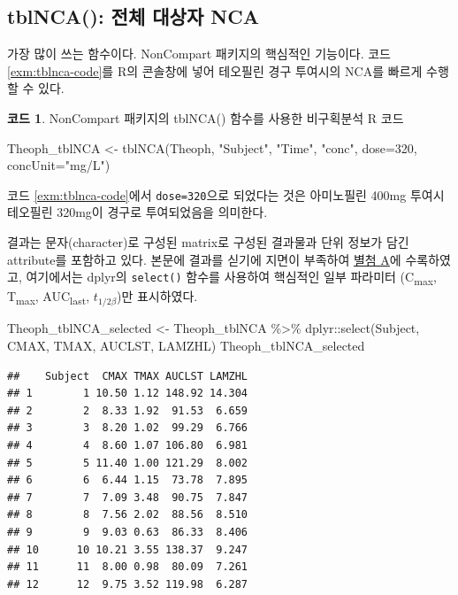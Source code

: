 \documentclass[
  11pt,
  krantz2, a4paper, twoside]{krantz}
\newenvironment{Shaded}{\begin{snugshade}}{\end{snugshade}}
\newcommand{\AttributeTok}[1]{\textcolor[rgb]{0.77,0.63,0.00}{#1}}
\newcommand{\DecValTok}[1]{\textcolor[rgb]{0.00,0.00,0.81}{#1}}
\newcommand{\FunctionTok}[1]{\textcolor[rgb]{0.00,0.00,0.00}{#1}}
\newcommand{\NormalTok}[1]{#1}
\newcommand{\OtherTok}[1]{\textcolor[rgb]{0.56,0.35,0.01}{#1}}
\newcommand{\SpecialCharTok}[1]{\textcolor[rgb]{0.00,0.00,0.00}{#1}}
\newcommand{\StringTok}[1]{\textcolor[rgb]{0.31,0.60,0.02}{#1}}
\theoremstyle{definition}
\theoremstyle{definition}
\newtheorem{example}{코드}[chapter]
\theoremstyle{definition}
\theoremstyle{definition}
\theoremstyle{remark}
\begin{document}
\hypertarget{tblNCA}{%
\subsection{tblNCA(): 전체 대상자 NCA}\label{tblNCA}}

가장 많이 쓰는 함수이다.
NonCompart 패키지의 핵심적인 기능이다.
코드 \ref{exm:tblnca-code}를 R의 콘솔창에 넣어 테오필린 경구 투여시의 NCA를 빠르게 수행할 수 있다.

\begin{example}
\protect\hypertarget{exm:tblnca-code}{}{\label{exm:tblnca-code} }NonCompart 패키지의 tblNCA() 함수를 사용한 비구획분석 R 코드
\end{example}
\vspace{-5ex}

\begin{Shaded}
\begin{Highlighting}[]
\NormalTok{Theoph\_tblNCA }\OtherTok{\textless{}{-}} \FunctionTok{tblNCA}\NormalTok{(Theoph, }\StringTok{"Subject"}\NormalTok{, }\StringTok{"Time"}\NormalTok{, }\StringTok{"conc"}\NormalTok{, }
                        \AttributeTok{dose=}\DecValTok{320}\NormalTok{, }\AttributeTok{concUnit=}\StringTok{"mg/L"}\NormalTok{)}
\end{Highlighting}
\end{Shaded}

코드 \ref{exm:tblnca-code}에서 \texttt{dose=320}으로 되었다는 것은 아미노필린 400mg 투여시 테오필린 320mg이 경구로 투여되었음을 의미한다.

결과는 문자(character)로 구성된 matrix로 구성된 결과물과 단위 정보가 담긴 attribute를 포함하고 있다.
본문에 결과를 싣기에 지면이 부족하여 \protect\hyperlink{Theoph_tblNCA}{별첨 A}에 수록하였고, 여기에서는 dplyr의 \texttt{select()} 함수를 사용하여 핵심적인 일부 파라미터 (C\textsubscript{max}, T\textsubscript{max}, AUC\textsubscript{last}, \(t_{1/2\beta}\))만 표시하였다.

\begin{Shaded}
\begin{Highlighting}[]
\NormalTok{Theoph\_tblNCA\_selected }\OtherTok{\textless{}{-}}\NormalTok{ Theoph\_tblNCA }\SpecialCharTok{\%\textgreater{}\%} 
\NormalTok{  dplyr}\SpecialCharTok{::}\FunctionTok{select}\NormalTok{(Subject, CMAX, TMAX, AUCLST, LAMZHL)}
\NormalTok{Theoph\_tblNCA\_selected}
\end{Highlighting}
\end{Shaded}

\begin{verbatim}
##    Subject  CMAX TMAX AUCLST LAMZHL
## 1        1 10.50 1.12 148.92 14.304
## 2        2  8.33 1.92  91.53  6.659
## 3        3  8.20 1.02  99.29  6.766
## 4        4  8.60 1.07 106.80  6.981
## 5        5 11.40 1.00 121.29  8.002
## 6        6  6.44 1.15  73.78  7.895
## 7        7  7.09 3.48  90.75  7.847
## 8        8  7.56 2.02  88.56  8.510
## 9        9  9.03 0.63  86.33  8.406
## 10      10 10.21 3.55 138.37  9.247
## 11      11  8.00 0.98  80.09  7.261
## 12      12  9.75 3.52 119.98  6.287
\end{verbatim}
\end{document}
